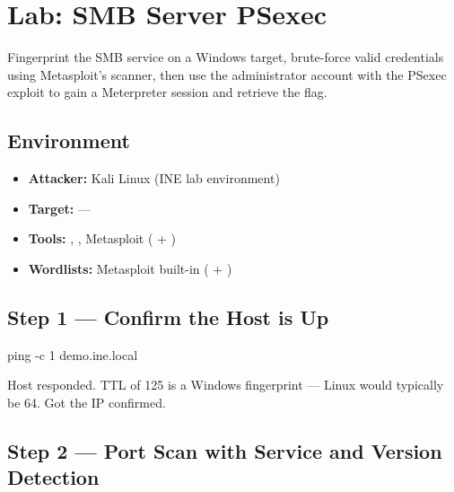 \chapter{Lab: SMB Server PSexec}
\label{lab:smb_psexec}

\begin{notebox}
Fingerprint the SMB service on a Windows target, brute-force valid credentials
using Metasploit's  scanner, then use the administrator account
with the PSexec exploit to gain a Meterpreter session and retrieve the flag.
\end{notebox}

\section*{Environment}
\begin{itemize}
  \item \textbf{Attacker:} Kali Linux (INE lab environment)
  \item \textbf{Target:}  --- 
  \item \textbf{Tools:} , , Metasploit ( +
        )
  \item \textbf{Wordlists:} Metasploit built-in ( +
        )
\end{itemize}

\section*{Step 1 --- Confirm the Host is Up}

\begin{termbox}
ping -c 1 demo.ine.local
\end{termbox}

Host responded. TTL of 125 is a Windows fingerprint --- Linux would typically be
64. Got the IP  confirmed.


\section*{Step 2 --- Port Scan with Service and Version Detection}

